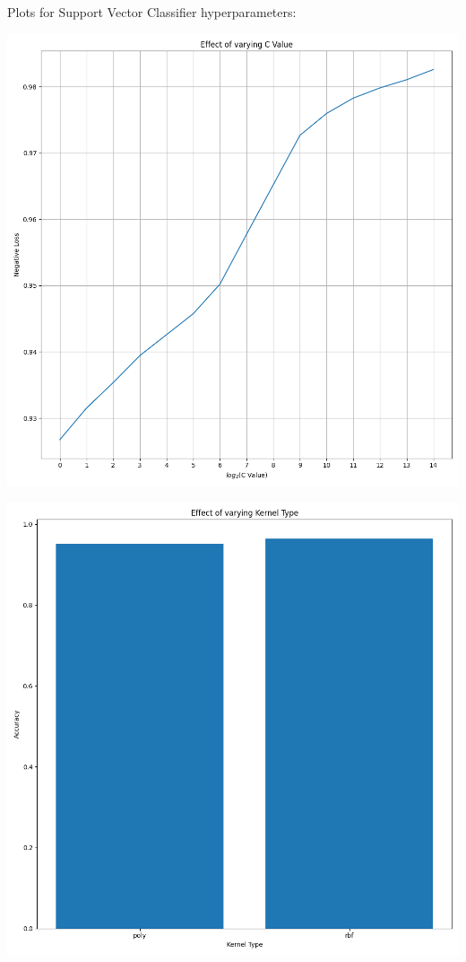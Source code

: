 \documentclass[12pt, letterpaper]{article}
\begin{document}
Plots for Support Vector Classifier hyperparameters:

\includegraphics[scale=\myscale]{svc_C Value.png}

\includegraphics[scale=\myscale]{svc_Kernel Type.png}
\end{document}
